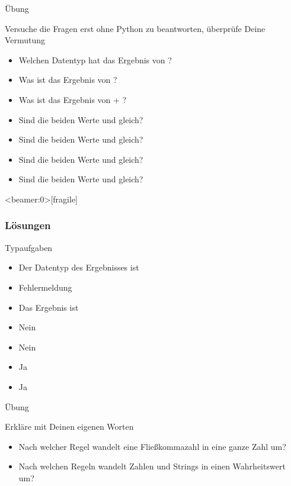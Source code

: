 	
	\begin{frame}{Übung}
		\begin{block}{Versuche die Fragen erst ohne Python zu beantworten, überprüfe Deine Vermutung}
			\begin{itemize}
				\item Welchen Datentyp hat das Ergebnis von  ?
				\item Was ist das Ergebnis von  ? 
				\item Was ist das Ergebnis von \py{"2"} + ? 
				\item Sind die beiden Werte  und  gleich? 
				\item Sind die beiden Werte  und  gleich? 
				\item Sind die beiden Werte  und  gleich? 
				\item Sind die beiden Werte  und  gleich? 
			\end{itemize}
		\end{block}
	\end{frame}


\begin{frame}<beamer:0>[fragile]
\frametitle{Lösungen}
\begin{solutionblock}{Typaufgaben}
	\begin{itemize}
		\item Der Datentyp des Ergebnisses ist 
		\item Fehlermeldung
		\item Das Ergebnis ist 
		\item Nein
		\item Nein 
		\item Ja
		\item Ja
	\end{itemize}
\end{solutionblock}
\end{frame}

	\begin{frame}{Übung}
	
	\begin{block}{Erkläre mit Deinen eigenen Worten}
		\begin{itemize}
			\item Nach welcher Regel wandelt  eine Fließkommazahl in eine ganze Zahl um? 
			\item Nach welchen Regeln wandelt  Zahlen und Strings in einen Wahrheitswert um? 
		\end{itemize}
	\end{block}
	
	
\end{frame}




